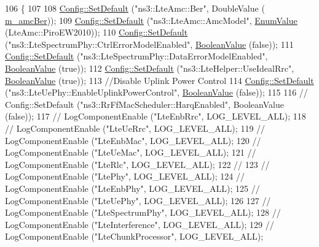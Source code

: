 \begin{DoxyCode}
106 \{
107 
108   \hyperlink{group__config_ga2e7882df849d8ba4aaad31c934c40c06}{Config::SetDefault} (\textcolor{stringliteral}{"ns3::LteAmc::Ber"}, DoubleValue (
      \hyperlink{classLenaHarqTestCase_adbc2a162861957d9858e16556c0988fe}{m\_amcBer}));
109   \hyperlink{group__config_ga2e7882df849d8ba4aaad31c934c40c06}{Config::SetDefault} (\textcolor{stringliteral}{"ns3::LteAmc::AmcModel"}, \hyperlink{classns3_1_1EnumValue}{EnumValue} (LteAmc::PiroEW2010));
110   \hyperlink{group__config_ga2e7882df849d8ba4aaad31c934c40c06}{Config::SetDefault} (\textcolor{stringliteral}{"ns3::LteSpectrumPhy::CtrlErrorModelEnabled"}, 
      \hyperlink{classns3_1_1BooleanValue}{BooleanValue} (\textcolor{keyword}{false}));
111   \hyperlink{group__config_ga2e7882df849d8ba4aaad31c934c40c06}{Config::SetDefault} (\textcolor{stringliteral}{"ns3::LteSpectrumPhy::DataErrorModelEnabled"}, 
      \hyperlink{classns3_1_1BooleanValue}{BooleanValue} (\textcolor{keyword}{true}));
112   \hyperlink{group__config_ga2e7882df849d8ba4aaad31c934c40c06}{Config::SetDefault} (\textcolor{stringliteral}{"ns3::LteHelper::UseIdealRrc"}, 
      \hyperlink{classns3_1_1BooleanValue}{BooleanValue} (\textcolor{keyword}{true}));
113   \textcolor{comment}{//Disable Uplink Power Control}
114   \hyperlink{group__config_ga2e7882df849d8ba4aaad31c934c40c06}{Config::SetDefault} (\textcolor{stringliteral}{"ns3::LteUePhy::EnableUplinkPowerControl"}, 
      \hyperlink{classns3_1_1BooleanValue}{BooleanValue} (\textcolor{keyword}{false}));
115 
116 \textcolor{comment}{//   Config::SetDefault ("ns3::RrFfMacScheduler::HarqEnabled", BooleanValue (false));}
117 \textcolor{comment}{//   LogComponentEnable ("LteEnbRrc", LOG\_LEVEL\_ALL);}
118 \textcolor{comment}{//   LogComponentEnable ("LteUeRrc", LOG\_LEVEL\_ALL);}
119 \textcolor{comment}{//   LogComponentEnable ("LteEnbMac", LOG\_LEVEL\_ALL);}
120 \textcolor{comment}{//   LogComponentEnable ("LteUeMac", LOG\_LEVEL\_ALL);}
121 \textcolor{comment}{//   LogComponentEnable ("LteRlc", LOG\_LEVEL\_ALL);}
122 \textcolor{comment}{//}
123 \textcolor{comment}{//   LogComponentEnable ("LtePhy", LOG\_LEVEL\_ALL);}
124 \textcolor{comment}{//   LogComponentEnable ("LteEnbPhy", LOG\_LEVEL\_ALL);}
125 \textcolor{comment}{//   LogComponentEnable ("LteUePhy", LOG\_LEVEL\_ALL);}
126 
127 \textcolor{comment}{//   LogComponentEnable ("LteSpectrumPhy", LOG\_LEVEL\_ALL);}
128 \textcolor{comment}{//   LogComponentEnable ("LteInterference", LOG\_LEVEL\_ALL);}
129 \textcolor{comment}{//   LogComponentEnable ("LteChunkProcessor", LOG\_LEVEL\_ALL);}

\end{DoxyCode}
